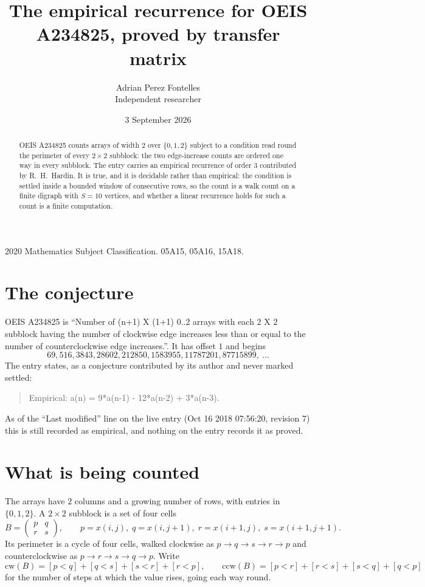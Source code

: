 \documentclass[11pt,a4paper]{article}
\title{The empirical recurrence for OEIS A234825, proved by transfer matrix}
\author{Adrian Perez Fontelles\\ \small Independent researcher}
\date{3 September 2026}
\theoremstyle{plain}
\theoremstyle{definition}
\begin{document}
\maketitle

\begin{abstract}
OEIS A234825 counts arrays of width $2$ over $\{0,1,2\}$ subject to a condition read round the
perimeter of every $2\times2$ subblock: the two edge-increase counts are ordered one way in every subblock. The entry carries an empirical recurrence of
order $3$ contributed by R.~H.~Hardin. It is true, and it is decidable rather than
empirical: the condition is settled inside a bounded window of consecutive rows, so the
count is a walk count on a finite digraph with $S=10$ vertices, and whether a linear
recurrence holds for such a count is a finite computation.
\end{abstract}

\noindent\small 2020 Mathematics Subject Classification. 05A15, 05A16, 15A18.\normalsize

\section{The conjecture}

OEIS A234825 is ``Number of (n+1) X (1+1) 0..2 arrays with each 2 X 2 subblock having the number of clockwise edge increases less than or equal to the number of counterclockwise edge increases.''. It has offset $1$ and begins
\[
69, 516, 3843, 28602, 212850, 1583955, 11787201, 87715899,\ \dots
\]
The entry states, as a conjecture contributed by its author and never marked settled:
\begin{quote}
Empirical: a(n) = 9*a(n-1) - 12*a(n-2) + 3*a(n-3).
\end{quote}
As of the ``Last modified'' line on the live entry (Oct 16 2018 07:56:20, revision 7) this is still
recorded as empirical, and nothing on the entry records it as proved.

\section{What is being counted}

The arrays have $2$ columns and a growing number of rows, with entries in $\{0,1,2\}$. A
$2\times2$ subblock is a set of four cells
\[
B=\begin{pmatrix} p & q \\ r & s \end{pmatrix},
\qquad p=x(i,j),\; q=x(i,j+1),\; r=x(i+1,j),\; s=x(i+1,j+1).
\]
Its perimeter is a cycle of four cells, walked clockwise as $p\to q\to s\to r\to p$ and
counterclockwise as $p\to r\to s\to q\to p$. Write
\[
\mathrm{cw}(B)=[p<q]+[q<s]+[s<r]+[r<p],\qquad
\mathrm{ccw}(B)=[p<r]+[r<s]+[s<q]+[q<p]
\]
for the number of steps at which the value rises, going each way round.
\end{document}
